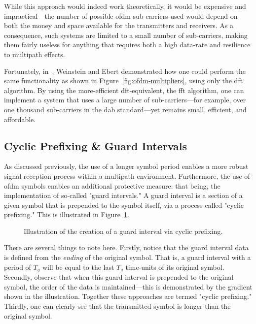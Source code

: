 \documentclass[class=report,11pt,crop=false]{standalone}
\begin{document}
While this approach would indeed work theoretically, it would be expensive and impractical---the number of possible \gls{ofdm} sub-carriers used would depend on both the money and space available for the transmitters and receivers. As a consequence, such systems are limited to a small number of sub-carriers, making them fairly useless for anything that requires both a high data-rate and resilience to multipath effects.

Fortunately, in~\cite{Weinstein1971}, Weinstein and Ebert demonstrated how one could perform the same functionality as shown in Figure~\ref{fig:ofdm-multipliers}, using only the \gls{dft} algorithm. By using the more-efficient \gls{dft}-equivalent, the \gls{fft} algorithm, one can implement a system that uses a large number of sub-carriers---for example, over one thousand sub-carriers in the \gls{dab} standard---yet remains small, efficient, and affordable.

\subsection{Cyclic Prefixing \& Guard Intervals}
As discussed previously, the use of a longer symbol period enables a more robust signal reception process within a multipath environment. Furthermore, the use of \gls{ofdm} symbols enables an additional protective measure: that being, the implementation of so-called "guard intervals." A guard interval is a section of a given symbol that is prepended to the symbol itself, via a process called "cyclic prefixing." This is illustrated in Figure~\ref{fig:cyclic-prefix}.

\begin{figure}[htbp]
    \centering
    \captionsetup{type=figure}
    \def\svgwidth{0.7\linewidth}
    { %
        }
    \caption{Illustration of the creation of a guard interval via cyclic prefixing.}
    \label{fig:cyclic-prefix}
\end{figure}

There are several things to note here. Firstly, notice that the guard interval data is defined from the \emph{ending} of the original symbol. That is, a guard interval with a period of \(T_g\) will be equal to the last \(T_g\) time-units of its original symbol. Secondly, observe that when this guard interval is prepended to the original symbol, the order of the data is maintained---this is demonstrated by the gradient shown in the illustration. Together these approaches are termed "cyclic prefixing." Thirdly, one can clearly see that the transmitted symbol is longer than the original symbol.
\end{document}
